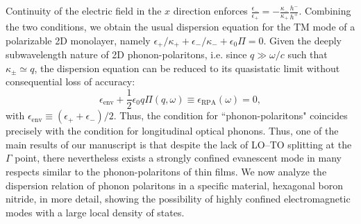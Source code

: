 \documentclass[aps,prb,twocolumn,
	           groupedaddress,superscriptaddress,
               amsfonts,amssymb,amsmath,floatfix,
	           citeautoscript]{revtex4-1}
\makeatletter
\newcommand{\ie}{i.e.\@\xspace} %
\newcommand{\comment}[2]{%
    \ifbool{togglecomments}%
    {\textcolor{blue!70!black}{\small\textsf{%
    \textsuperscript{\textsc{\textsf{\MakeLowercase{#1}}}}%
    [#2]}}} %
    {}}     %
\makeatother
\begin{document}
Continuity of the electric field in the $x$ direction enforces $\frac{\epsilon_-}{\epsilon_+} = -\frac{\kappa_-}{\kappa_+}\frac{h^-}{h^+}$. 
Combining the two conditions, we obtain the usual dispersion equation for the TM mode of a polarizable 2D monolayer, namely $\epsilon_+/\kappa_+ + \epsilon_-/\kappa_- +\epsilon_0\Pi=0$. Given the deeply subwavelength nature of 2D phonon-polaritons, \ie since $q\gg\omega/c$ such that $\kappa_{\pm}\simeq q$, the dispersion equation can be reduced to its quasistatic limit without consequential loss of accuracy:
\begin{equation}
    \epsilon_{\mathrm{env}} + \frac{1}{2}\epsilon_0 q \Pi(q,\omega) \equiv \epsilon_{\mathrm{RPA}}(\omega) = 0,
    \label{eq:dispeq}
\end{equation}
with $\epsilon_{\mathrm{env}}\equiv (\epsilon_++\epsilon_-)/2$. Thus, the condition for ``phonon-polaritons" coincides precisely with the condition for longitudinal optical phonons.  Thus, one of the main results of our manuscript is that despite the lack of LO--TO splitting at the $\Gamma$ point, there nevertheless exists a strongly confined evanescent mode in many respects similar to the phonon-polaritons of thin films. We now analyze the dispersion relation of phonon polaritons in a specific material, hexagonal boron nitride, in more detail, showing the possibility of highly confined electromagnetic modes with a large local density of states. %


\end{document}
